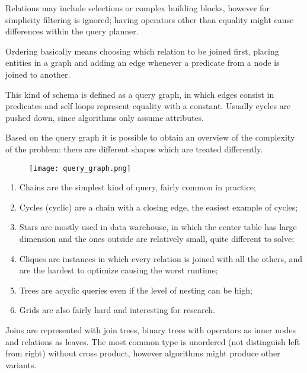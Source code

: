 Relations may include selections or complex building blocks, however for simplicity filtering is ignored; having operators other than equality might cause differences within the query planner.

Ordering basically means choosing which relation to be joined first, placing entities in a graph and adding an edge whenever a predicate from a node is joined to another. 

This kind of schema is defined as a query graph, in which edges consist in predicates and self loops represent equality with a constant. Usually cycles are pushed down, since algorithms only assume attributes. 

Based on the query graph it is possible to obtain an overview of the complexity of the problem: there are different shapes which are treated differently. 

\begin{figure}[h]
	\texttt{[image: query\_graph.png]}
	\centering
\end{figure}

\begin{enumerate}
	\item Chains are the simplest kind of query, fairly common in practice;
	\item Cycles (cyclic) are a chain with a closing edge, the easiest example of cycles;
	\item Stars are mostly used in data warehouse, in which the center table has large dimension and the ones outside are relatively small, quite different to solve;
	\item Cliques are instances in which every relation is joined with all the others, and are the hardest to optimize causing the worst runtime;
	\item Trees are acyclic queries even if the level of nesting can be high;
	\item Grids are also fairly hard and interesting for research.
\end{enumerate}

Joins are represented with join trees, binary trees with operators as inner nodes and relations as leaves. The most common type is unordered (not distinguish left from right) without cross product, however algorithms might produce other variants.

